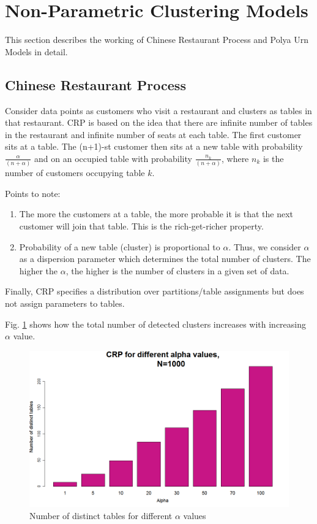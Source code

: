 \documentclass{article} %
\begin{document}
\section{Non-Parametric Clustering Models}
This section describes the working of Chinese Restaurant Process and Polya Urn Models in detail.
\subsection{Chinese Restaurant Process}
Consider data points as customers who visit a restaurant and clusters as tables in that restaurant. CRP is based on the idea that there are infinite number of tables in the restaurant and infinite number of seats at each table. The first customer sits at a table. The (n+1)-st customer then sits at a new table with probability $\frac{\alpha}{(n+\alpha)}$ and on an occupied table with probability $\frac{n_k}{(n+\alpha)}$, where $n_k$ is the number of customers occupying table $k$.

Points to note:
\begin{enumerate}
\item The more the customers at a table, the more probable it is that the next customer will join that table. This is the rich-get-richer property.
\item Probability of a new table (cluster) is proportional to $\alpha$. Thus, we consider $\alpha$ as a dispersion parameter which determines the total number of clusters. The higher the $\alpha$, the higher is the number of clusters in a given set of data.
\end{enumerate}
Finally, CRP specifies a distribution over partitions/table assignments but does not assign parameters to tables.

Fig. \ref{fig:crp} shows how the total number of detected clusters increases with increasing $\alpha$ value.
\begin{figure}[h]
\begin{center}
\includegraphics[width=.5\linewidth]{plots/crp.png}
\caption{Number of distinct tables for different $\alpha$ values}
\label{fig:crp}
\end{center}
\end{figure}
\end{document}
